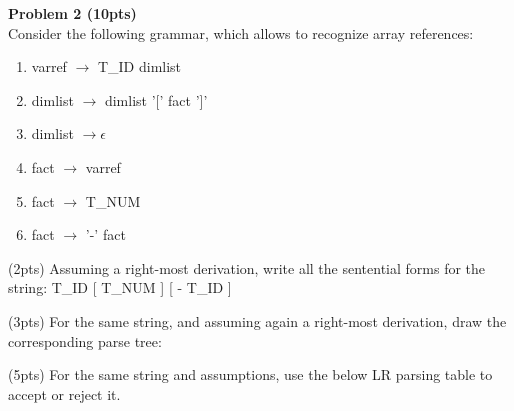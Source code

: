 
\noindent
{\bf Problem 2 (10pts)}\\

Consider the following grammar, which allows to recognize array references:
\\

\begin{enumerate}
\item
 varref $\rightarrow$ T\_ID dimlist 
\item
 dimlist $\rightarrow$ dimlist '[' fact ']' 
\item
 dimlist $\rightarrow         \epsilon$
\item
 fact $\rightarrow$ varref 
\item
 fact $\rightarrow$ T\_NUM 
\item
fact  $\rightarrow$ '-' fact 
\end{enumerate}


\vspace{1cm}

\noindent
(2pts) Assuming a right-most derivation, write all the sentential forms for the string: T\_ID [ T\_NUM ] [ - T\_ID ]

\vspace{3in}

\noindent
(3pts) For the same string, and assuming again a right-most derivation, draw the corresponding parse tree:

\vspace{4in}



\pagebreak
\noindent
(5pts) For the same string and assumptions, use the below LR parsing table to accept or reject it.

\vspace{0.5cm}

